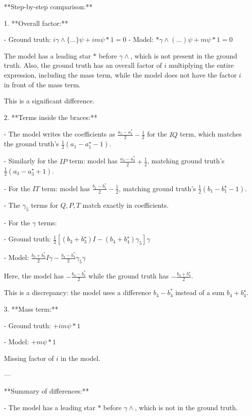 \documentclass[10pt]{article}
\begin{document}
**Step-by-step comparison:**

1. **Overall factor:**

- Ground truth: \( i \gamma \wedge \{ \ldots \} \psi + i m \psi * 1 = 0 \)
- Model: \( * \gamma \wedge ( \ldots ) \psi + m \psi * 1 = 0 \)

The model has a leading star \( * \) before \(\gamma \wedge\), which is not present in the ground truth. Also, the ground truth has an overall factor of \(i\) multiplying the entire expression, including the mass term, while the model does not have the factor \(i\) in front of the mass term.

This is a significant difference.

2. **Terms inside the braces:**

- The model writes the coefficients as \(\frac{a_1 - a_1^*}{2} - \frac{1}{2}\) for the \(I Q\) term, which matches the ground truth's \(\frac{1}{2}(a_1 - a_1^\star - 1)\).

- Similarly for the \(I P\) term: model has \(\frac{a_3 - a_3^*}{2} + \frac{1}{2}\), matching ground truth's \(\frac{1}{2}(a_3 - a_3^\star + 1)\).

- For the \(I T\) term: model has \(\frac{b_1 - b_1^*}{2} - \frac{1}{2}\), matching ground truth's \(\frac{1}{2}(b_1 - b_1^\star - 1)\).

- The \(\gamma_5\) terms for \(Q, P, T\) match exactly in coefficients.

- For the \(\gamma\) terms:

  - Ground truth: \(\frac{1}{2}[(b_3 + b_3^\star) I - (b_4 + b_4^\star) \gamma_5] \gamma\)

  - Model: \(\frac{b_3 + b_3^*}{2} I \gamma - \frac{b_4 - b_4^*}{2} \gamma_5 \gamma\)

Here, the model has \(- \frac{b_4 - b_4^*}{2}\) while the ground truth has \(- \frac{b_4 + b_4^\star}{2}\).

This is a discrepancy: the model uses a difference \(b_4 - b_4^*\) instead of a sum \(b_4 + b_4^\star\).

3. **Mass term:**

- Ground truth: \(+ i m \psi * 1\)

- Model: \(+ m \psi * 1\)

Missing factor of \(i\) in the model.

---

**Summary of differences:**

- The model has a leading star \( * \) before \(\gamma \wedge\), which is not in the ground truth.
\end{document}
